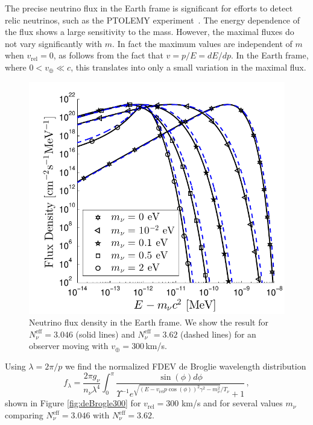 The precise neutrino flux in the Earth frame is significant for efforts to detect relic neutrinos, such as the PTOLEMY experiment~\cite{Betts:2013uya}. The energy dependence of the flux shows a large sensitivity to the mass. However, the maximal fluxes do not vary significantly with $m$. In fact the maximum values are independent of $m$ when $v_{\text{rel}}=0$, as follows from the fact that $v=p/E=dE/dp$.  In the Earth frame, where $0<v_\oplus\ll c$, this translates into only a small variation in the maximal flux.

\begin{figure}
\centerline{\includegraphics[width=0.9\linewidth]{04-birrell/NeutrinoDistributionToday/Figures/flux_dist.pdf}}
\caption{Neutrino flux density in the Earth frame. We show the result for $N_\nu^{\mathrm{eff}}=3.046$ (solid lines) and $N_\nu^{\mathrm{eff}}=3.62$ (dashed lines) for an observer moving with $v_\oplus=300$\,km/s. }
\label{fig:fluxDist}
 \end{figure}

Using $\lambda=2\pi/p$ we find  the normalized FDEV de Broglie wavelength distribution
\begin{equation}
f_\lambda=\frac{ 2\pi g_\nu}{n_\nu\lambda^4}\!\!\int_0^\pi\!\!\! \!\frac{\sin(\phi) d\phi}{\Upsilon^{-1}e^{\sqrt{( E-v_{\text{rel}} p \cos(\phi))^2\gamma^2-m_\nu^2}/T_\nu}\!\!+\!1}\,,
\end{equation}
shown in Figure \ref{fig:deBrogle300} for $v_{\text{rel}}=300$ km/s and for several values $m_\nu$ comparing  $N_\nu^{\mathrm{eff}}=3.046$ with $N_\nu^{\mathrm{eff}}=3.62$. 

